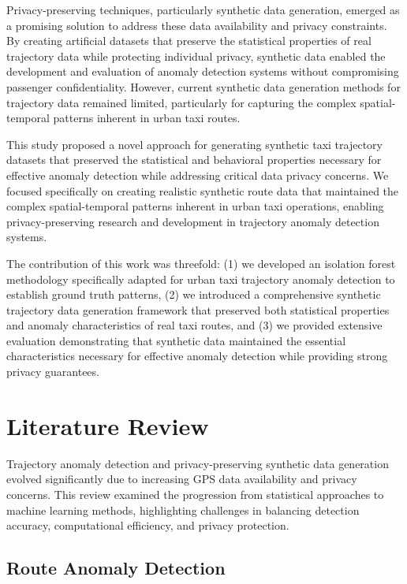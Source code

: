 \documentclass[runningheads]{llncs}
\begin{document}
Privacy-preserving techniques, particularly synthetic data generation, emerged as a promising solution to address these data availability and privacy constraints. By creating artificial datasets that preserve the statistical properties of real trajectory data while protecting individual privacy, synthetic data enabled the development and evaluation of anomaly detection systems without compromising passenger confidentiality. However, current synthetic data generation methods for trajectory data remained limited, particularly for capturing the complex spatial-temporal patterns inherent in urban taxi routes.

This study proposed a novel approach for generating synthetic taxi trajectory datasets that preserved the statistical and behavioral properties necessary for effective anomaly detection while addressing critical data privacy concerns. We focused specifically on creating realistic synthetic route data that maintained the complex spatial-temporal patterns inherent in urban taxi operations, enabling privacy-preserving research and development in trajectory anomaly detection systems.

The contribution of this work was threefold: (1) we developed an isolation forest methodology specifically adapted for urban taxi trajectory anomaly detection to establish ground truth patterns, (2) we introduced a comprehensive synthetic trajectory data generation framework that preserved both statistical properties and anomaly characteristics of real taxi routes, and (3) we provided extensive evaluation demonstrating that synthetic data maintained the essential characteristics necessary for effective anomaly detection while providing strong privacy guarantees.

\section{Literature Review}
\label{sec:literature-review}

Trajectory anomaly detection and privacy-preserving synthetic data generation evolved significantly due to increasing GPS data availability and privacy concerns. This review examined the progression from statistical approaches to machine learning methods, highlighting challenges in balancing detection accuracy, computational efficiency, and privacy protection.

\subsection{Route Anomaly Detection}
\label{sec:detection-review}
\end{document}

